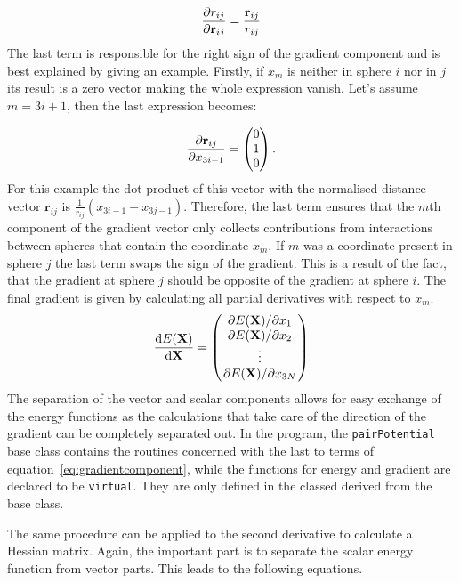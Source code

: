 \begin{align}
    \pdv{r_{ij}}{\mathbf{r}_{ij}}=\frac{\mathbf{r}_{ij}}{r_{ij}}
\end{align}%
%
The last term is responsible for the right sign of the gradient component and
is best explained by giving an example. Firstly, if $x_m$ is neither in sphere
$i$ nor in $j$ its result is a zero vector making the whole expression vanish.
Let's assume $m=3i+1$, then the last expression becomes:

\begin{align}
    \pdv{\mathbf{r}_{ij}}{x_{3i-1}}=
    \begin{pmatrix}
        0\\1\\0
    \end{pmatrix}.
\end{align}%
%
For this example the dot product of this vector with the normalised distance
vector $\mathbf{r}_{ij}$ is $\frac{1}{r_{ij}}(x_{3i-1} - x_{3j-1})$. Therefore,
the last term ensures that the $m$th component of the gradient vector only
collects contributions from interactions between spheres that contain the
coordinate $x_m$. If $m$ was a coordinate present in sphere $j$ the last term
swaps the sign of the gradient. This is a result of the fact, that the gradient
at sphere $j$ should be opposite of the gradient at sphere $i$. The final
gradient is given by calculating all partial derivatives with respect to $x_m$.
%
\begin{align}
    \dv{E(\mathbf{X})}{\mathbf{X}}=
    \begin{pmatrix}
        \pdv*{E(\mathbf{X})}{x_1}\\
        \pdv*{E(\mathbf{X})}{x_2}\\
        \vdots\\
        \pdv*{E(\mathbf{X})}{x_{3N}}
    \end{pmatrix}
\end{align}
%
The separation of the vector and scalar components allows for easy exchange of
the energy functions as the calculations that take care of the direction of the
gradient can be completely separated out. In the program, the
\texttt{pairPotential} base class contains the routines concerned with the last
to terms of equation~\eqref{eq:gradientcomponent}, while the functions for
energy and gradient are declared to be \texttt{virtual}. They are only defined
in the classed derived from the base class.

The same procedure can be applied to the second derivative to calculate a
Hessian matrix. Again, the important part is to separate the scalar energy
function from vector parts. This leads to the following equations.

